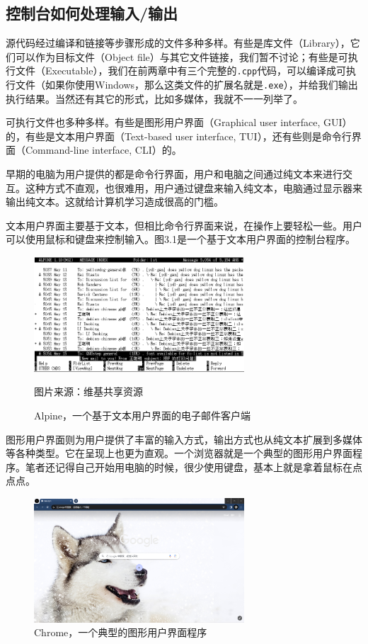 \subsection*{控制台如何处理输入/输出}
源代码经过编译和链接等步骤形成的文件多种多样。有些是库文件（Library），它们可以作为目标文件（Object file）与其它文件链接，我们暂不讨论；有些是可执行文件（Executable），我们在前两章中有三个完整的\texttt{.cpp}代码，可以编译成可执行文件（如果你使用Windows，那么这类文件的扩展名就是\texttt{.exe}），并给我们输出执行结果。当然还有其它的形式，比如多媒体，我就不一一列举了。\par
可执行文件也多种多样。有些是图形用户界面（Graphical user interface, GUI）的，有些是文本用户界面（Text-based user interface, TUI），还有些则是命令行界面（Command-line interface, CLI）的。\par
早期的电脑为用户提供的都是命令行界面，用户和电脑之间通过纯文本来进行交互。这种方式不直观，也很难用，用户通过键盘来输入纯文本，电脑通过显示器来输出纯文本。这就给计算机学习造成很高的门槛。\par
文本用户界面主要基于文本，但相比命令行界面来说，在操作上要轻松一些。用户可以使用鼠标和键盘来控制输入。图3.1是一个基于文本用户界面的控制台程序。\par
\begin{figure}[htbp]
    \centering
    \includegraphics[width=0.7\textwidth]{../images/generalized_parts/03_Alpine_email_client.png}
    \caption{Alpine，一个基于文本用户界面的电子邮件客户端}
    \footnotesize{图片来源：维基共享资源}
\end{figure}
图形用户界面则为用户提供了丰富的输入方式，输出方式也从纯文本扩展到多媒体等各种类型。它在呈现上也更为直观。一个浏览器就是一个典型的图形用户界面程序。笔者还记得自己开始用电脑的时候，很少使用键盘，基本上就是拿着鼠标在点点点。\par
\begin{figure}[htbp]
    \centering
    \includegraphics[width=0.7\textwidth]{../images/generalized_parts/03_GUI_example_Chrome.png}
    \caption{Chrome，一个典型的图形用户界面程序}
\end{figure}
